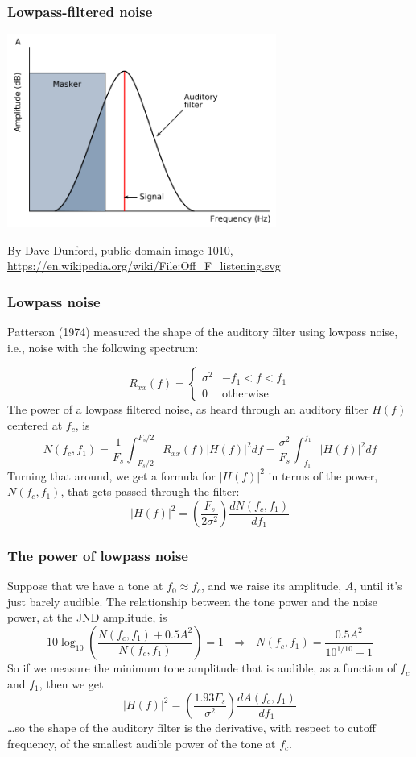 \documentclass{beamer}
\begin{document}
\begin{frame}
  \frametitle{Lowpass-filtered noise}

  \centerline{\includegraphics[height=2.5in]{Off_F_listening.png}}
  \begin{tiny}
    By Dave Dunford, public domain image 1010,
    \url{https://en.wikipedia.org/wiki/File:Off_F_listening.svg}
  \end{tiny}
\end{frame}

\begin{frame}
  \frametitle{Lowpass noise}

  Patterson (1974) measured the shape of the auditory filter using
  lowpass noise, i.e., noise with the following spectrum:

  \[
  R_{xx}(f)  =\begin{cases}
  \sigma^2 & -f_1 < f<f_1\\ 0&\mbox{otherwise}
  \end{cases}
  \]
  The power of a lowpass filtered noise, as heard through
  an auditory filter $H(f)$ centered at $f_c$, is
  \[
  N(f_c,f_1)= \frac{1}{F_s}\int_{-F_s/2}^{F_s/2} R_{xx}(f) |H(f)|^2 df
  = \frac{\sigma^2}{F_s}\int_{-f_1}^{f_1} |H(f)|^2 df
  \]
  Turning that around, we get a formula for $|H(f)|^2$ in terms of the
  power, $N(f_c,f_1)$, that gets passed through the filter:
  \[
  |H(f)|^2=\left(\frac{F_s}{2\sigma^2}\right)
  \frac{dN(f_c,f_1)}{df_1}
  \]
\end{frame}


\begin{frame}
  \frametitle{The power of lowpass noise}

  Suppose that we have a tone at $f_0\approx f_c$, and we raise its
  amplitude, $A$, until it's just barely audible.  The relationship between the
  tone power and the noise power, at the JND amplitude, is
  \[
  10\log_{10}\left(\frac{N(f_c,f_1)+0.5A^2}{N(f_c,f_1)}\right) = 1~~~\Rightarrow~~~
  N(f_c,f_1)= \frac{0.5A^2}{10^{1/10}-1}
  \]
  So if we measure the minimum tone amplitude that is audible, as a  function
  of $f_c$ and $f_1$, then we get 
  \[
  |H(f)|^2 = \left(\frac{1.93 F_s}{\sigma^2}\right)
  \frac{dA(f_c,f_1)}{df_1}
  \]
  \ldots so the shape of the auditory filter is the derivative, with respect to
  cutoff frequency, of the smallest audible power of the tone at $f_c$.
\end{frame}
\end{document}
